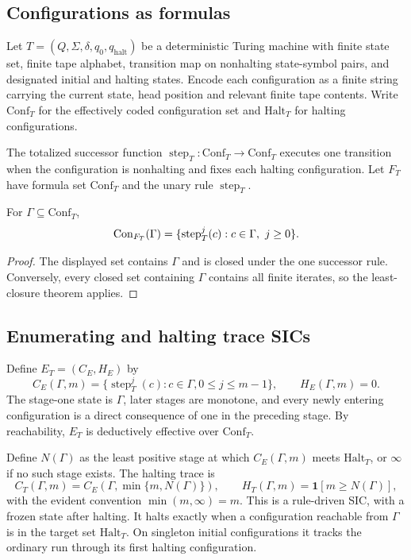 \documentclass[11pt,letterpaper]{article}
\begin{document}
\subsection{Configurations as formulas}
Let $T=(Q,\Sigma,\delta,q_0,q_{\mathrm{halt}})$ be a deterministic Turing machine with finite state set, finite tape alphabet, transition map on nonhalting state-symbol pairs, and designated initial and halting states. Encode each configuration as a finite string carrying the current state, head position and relevant finite tape contents. Write $\mathrm{Conf}_T$ for the effectively coded configuration set and $\mathrm{Halt}_T$ for halting configurations.

The totalized successor function $\operatorname{step}_T:\mathrm{Conf}_T\to\mathrm{Conf}_T$ executes one transition when the configuration is nonhalting and fixes each halting configuration. Let $F_T$ have formula set $\mathrm{Conf}_T$ and the unary rule $\operatorname{step}_T$.
\begin{proposition}[Reachability]
For $\Gamma\subseteq\mathrm{Conf}_T$,
\[
\Con_{F_T}(\Gamma)=\{\operatorname{step}_T^j(c):c\in\Gamma,\ j\ge0\}.
\]
\end{proposition}
\begin{proof}
The displayed set contains $\Gamma$ and is closed under the one successor rule. Conversely, every closed set containing $\Gamma$ contains all finite iterates, so the least-closure theorem applies.
\end{proof}
\subsection{Enumerating and halting trace SICs}
Define $E_T=(C_E,H_E)$ by
\[
C_E(\Gamma,m)=\{\operatorname{step}_T^j(c):c\in\Gamma,0\le j\le m-1\},\qquad H_E(\Gamma,m)=0.
\]
The stage-one state is $\Gamma$, later stages are monotone, and every newly entering configuration is a direct consequence of one in the preceding stage. By reachability, $E_T$ is deductively effective over $\mathrm{Conf}_T$.

Define $N(\Gamma)$ as the least positive stage at which $C_E(\Gamma,m)$ meets $\mathrm{Halt}_T$, or $\infty$ if no such stage exists. The halting trace is
\[
C_T(\Gamma,m)=C_E(\Gamma,\min\{m,N(\Gamma)\}),\qquad H_T(\Gamma,m)=\mathbf1[m\ge N(\Gamma)],
\]
with the evident convention $\min(m,\infty)=m$. This is a rule-driven SIC, with a frozen state after halting. It halts exactly when a configuration reachable from $\Gamma$ is in the target set $\mathrm{Halt}_T$. On singleton initial configurations it tracks the ordinary run through its first halting configuration.
\end{document}
